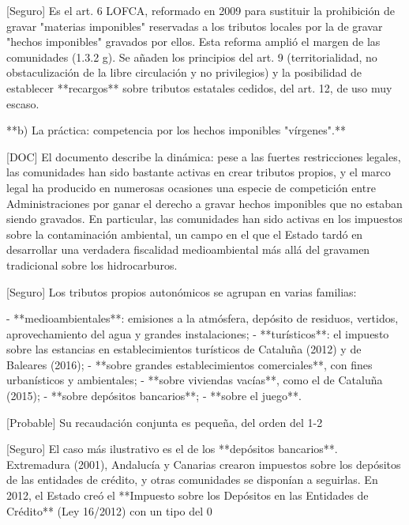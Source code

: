 \documentclass[10pt,a4paper]{article}
\begin{document}
[Seguro] Es el art. 6 LOFCA, reformado en 2009 para sustituir la prohibición de gravar "materias imponibles" reservadas a los tributos locales por la de gravar "hechos imponibles" gravados por ellos. Esta reforma amplió el margen de las comunidades (1.3.2 g). Se añaden los principios del art. 9 (territorialidad, no obstaculización de la libre circulación y no privilegios) y la posibilidad de establecer **recargos** sobre tributos estatales cedidos, del art. 12, de uso muy escaso.

**b) La práctica: competencia por los hechos imponibles "vírgenes".**

[DOC] El documento describe la dinámica: pese a las fuertes restricciones legales, las comunidades han sido bastante activas en crear tributos propios, y el marco legal ha producido en numerosas ocasiones una especie de competición entre Administraciones por ganar el derecho a gravar hechos imponibles que no estaban siendo gravados. En particular, las comunidades han sido activas en los impuestos sobre la contaminación ambiental, un campo en el que el Estado tardó en desarrollar una verdadera fiscalidad medioambiental más allá del gravamen tradicional sobre los hidrocarburos.

[Seguro] Los tributos propios autonómicos se agrupan en varias familias:

- **medioambientales**: emisiones a la atmósfera, depósito de residuos, vertidos, aprovechamiento del agua y grandes instalaciones;
- **turísticos**: el impuesto sobre las estancias en establecimientos turísticos de Cataluña (2012) y de Baleares (2016);
- **sobre grandes establecimientos comerciales**, con fines urbanísticos y ambientales;
- **sobre viviendas vacías**, como el de Cataluña (2015);
- **sobre depósitos bancarios**;
- **sobre el juego**.

[Probable] Su recaudación conjunta es pequeña, del orden del 1-2%

[Seguro] El caso más ilustrativo es el de los **depósitos bancarios**. Extremadura (2001), Andalucía y Canarias crearon impuestos sobre los depósitos de las entidades de crédito, y otras comunidades se disponían a seguirlas. En 2012, el Estado creó el **Impuesto sobre los Depósitos en las Entidades de Crédito** (Ley 16/2012) con un tipo del 0%
\end{document}
